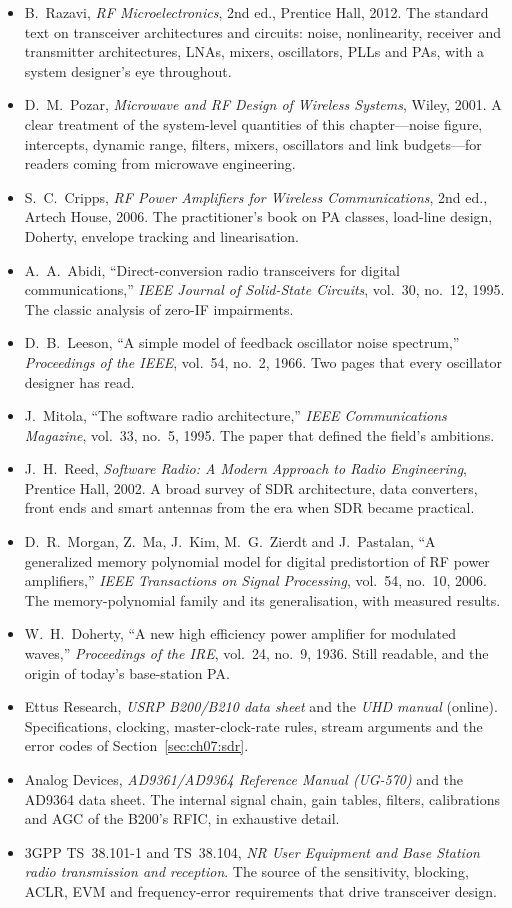 \furtherreading
\begin{itemize}
\item B.~Razavi, \emph{RF Microelectronics}, 2nd ed., Prentice Hall, 2012. The standard text on
transceiver architectures and circuits: noise, nonlinearity, receiver and transmitter architectures, LNAs,
mixers, oscillators, PLLs and PAs, with a system designer's eye throughout.
\item D.~M.~Pozar, \emph{Microwave and RF Design of Wireless Systems}, Wiley, 2001. A clear treatment of
the system-level quantities of this chapter---noise figure, intercepts, dynamic range, filters, mixers,
oscillators and link budgets---for readers coming from microwave engineering.
\item S.~C.~Cripps, \emph{RF Power Amplifiers for Wireless Communications}, 2nd ed., Artech House, 2006.
The practitioner's book on PA classes, load-line design, Doherty, envelope tracking and linearisation.
\item A.~A.~Abidi, ``Direct-conversion radio transceivers for digital communications,'' \emph{IEEE Journal
of Solid-State Circuits}, vol.~30, no.~12, 1995. The classic analysis of zero-IF impairments.
\item D.~B.~Leeson, ``A simple model of feedback oscillator noise spectrum,'' \emph{Proceedings of the
IEEE}, vol.~54, no.~2, 1966. Two pages that every oscillator designer has read.
\item J.~Mitola, ``The software radio architecture,'' \emph{IEEE Communications Magazine}, vol.~33,
no.~5, 1995. The paper that defined the field's ambitions.
\item J.~H.~Reed, \emph{Software Radio: A Modern Approach to Radio Engineering}, Prentice Hall, 2002. A
broad survey of SDR architecture, data converters, front ends and smart antennas from the era when SDR
became practical.
\item D.~R.~Morgan, Z.~Ma, J.~Kim, M.~G.~Zierdt and J.~Pastalan, ``A generalized memory polynomial model
for digital predistortion of RF power amplifiers,'' \emph{IEEE Transactions on Signal Processing},
vol.~54, no.~10, 2006. The memory-polynomial family and its generalisation, with measured results.
\item W.~H.~Doherty, ``A new high efficiency power amplifier for modulated waves,'' \emph{Proceedings of
the IRE}, vol.~24, no.~9, 1936. Still readable, and the origin of today's base-station PA.
\item Ettus Research, \emph{USRP B200/B210 data sheet} and the \emph{UHD manual} (online). Specifications,
clocking, master-clock-rate rules, stream arguments and the error codes of
Section~\ref{sec:ch07:sdr}.
\item Analog Devices, \emph{AD9361/AD9364 Reference Manual (UG-570)} and the AD9364 data sheet. The
internal signal chain, gain tables, filters, calibrations and AGC of the B200's RFIC, in exhaustive detail.
\item 3GPP TS~38.101-1 and TS~38.104, \emph{NR User Equipment and Base Station radio transmission and
reception}. The source of the sensitivity, blocking, ACLR, EVM and frequency-error requirements that drive
transceiver design.
\end{itemize}
